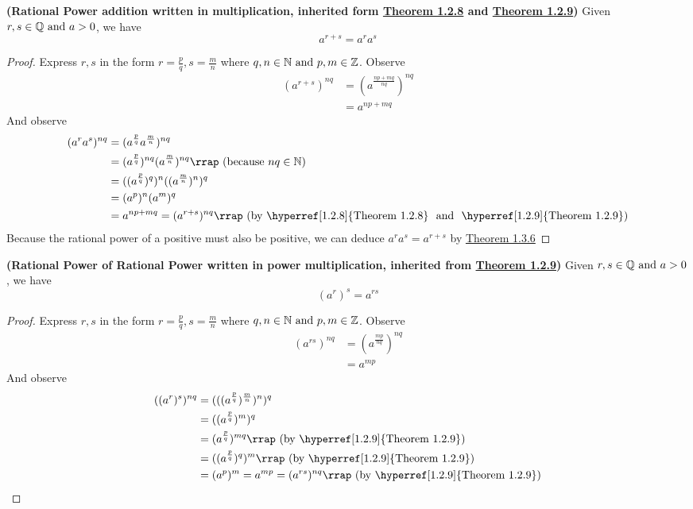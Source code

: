 \documentclass{report}
\begin{document}
\begin{theorem}
    \label{1.3.10}
 \textbf{(Rational Power addition written in multiplication, inherited form \hyperref[1.2.8]{Theorem 1.2.8} and \hyperref[1.2.9]{Theorem 1.2.9})} Given $r,s\in\mathbb{Q}\text{ and }a>0$, we have
\begin{equation}
a^{r+s}=a^ra^s
\end{equation}
\end{theorem}
\begin{proof}
Express $r,s$ in the form $r=\frac{p}{q},s=\frac{m}{n}$ where $q,n\in\mathbb{N}\text{ and }p,m \in\mathbb{Z}$. Observe
\begin{align}
  (a^{r+s})^{nq}&=(a^{\frac{np+mq}{nq}})^{nq}\\
  &=a^{np+mq} 
\end{align}
And observe
\begin{align}
  (a^ra^s)^{nq}&= (a^{\frac{p}{q}}a^{\frac{m}{n}})^{nq} \\
  &= (a^{\frac{p}{q}})^{nq}(a^{\frac{m}{n}})^{nq}\rap{because $nq\inn$}\\
  &=((a^{\frac{p}{q}})^q)^n((a^{\frac{m}{n}})^n)^q\\
&=(a^p)^n(a^m)^q\\
&= a^{np+mq}=(a^{r+s})^{nq}\rap{by \hyperref[1.2.8]{Theorem 1.2.8} \text{ and } \hyperref[1.2.9]{Theorem 1.2.9}} 
\end{align}
Because the rational power of a positive must also be positive, we can deduce $a^ra^s=a^{r+s}$ by \hyperref[1.3.6]{Theorem 1.3.6}
\end{proof}
\begin{theorem}
  \label{1.3.11}
\textbf{(Rational Power of Rational Power written in power multiplication, inherited from \hyperref[1.2.9]{Theorem 1.2.9})} Given $r,s\in\mathbb{Q}\text{ and }a>0$, we have
\begin{equation}
  (a^r)^s=a^{rs}
\end{equation}
\end{theorem}
\begin{proof}
Express $r,s$ in the form $r=\frac{p}{q},s=\frac{m}{n}$ where $q,n\in\mathbb{N}\text{ and }p,m \in\mathbb{Z}$. Observe
\begin{align}
  (a^{rs})^{nq}&=(a^{\frac{mp}{nq}})^{nq}\\
  &= a^{mp}
\end{align}
And observe
\begin{align}
  ((a^r)^s)^{nq}&=(((a^{\frac{p}{q}})^{\frac{m}{n}})^n)^q\\
  &=((a^{\frac{p}{q}})^m)^q\\
  &=(a^{\frac{p}{q}})^{mq}\rap{by \hyperref[1.2.9]{Theorem 1.2.9}}\\
  &=((a^{\frac{p}{q}})^q)^m \rap{by \hyperref[1.2.9]{Theorem 1.2.9}}\\
  &=(a^p)^m=a^{mp}=(a^{rs})^{nq} \rap{by \hyperref[1.2.9]{Theorem 1.2.9}} 
\end{align}
\end{proof}
\end{document}

